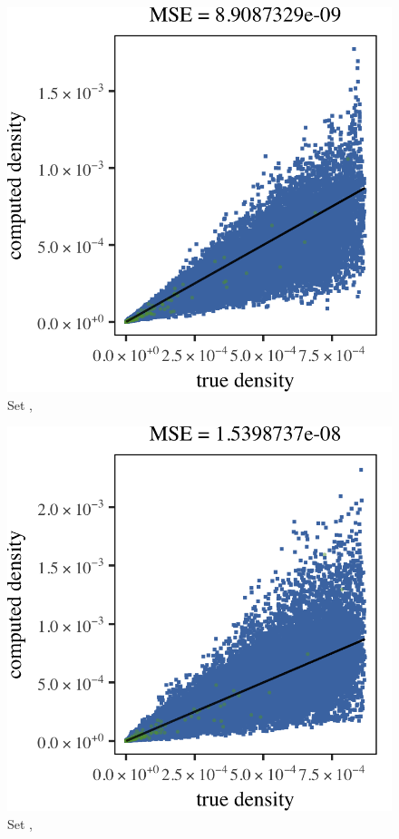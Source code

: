 \begin{subfigure}{0.23\textwidth}
	\centering
	\includegraphics[keepaspectratio=true, width=\textwidth, height=0.23\textheight]{result/img/results_ferdosi_1_60000_sambe_silverman}
	\caption{Set \ferdosiOne, \sambe}
	\label{fig:results:singlesphere:sambe:ferdosi1}
\end{subfigure}
\begin{subfigure}{0.23\textwidth}
	\centering
	\includegraphics[keepaspectratio=true, width=\textwidth, height=0.23\textheight]{result/img/results_baakman_1_60000_sambe_silverman}
	\caption{Set \baakmanOne, \sambe}
	\label{fig:results:singlesphere:sambe:baakman1}
\end{subfigure}
